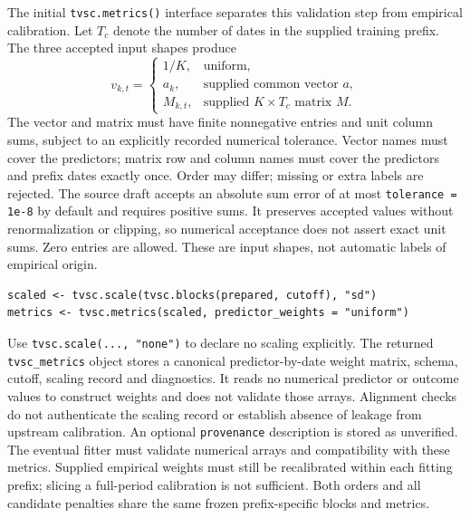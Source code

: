 \documentclass[11pt]{article}
\begin{document}
The initial \texttt{tvsc.metrics()} interface separates this validation
step from empirical calibration. Let $T_c$ denote the number of dates in
the supplied training prefix. The three accepted input shapes produce
\[
 v_{k,t}=\begin{cases}
  1/K, & \text{uniform},\\
  a_k, & \text{supplied common vector }a,\\
  M_{k,t}, & \text{supplied }K\times T_c\text{ matrix }M.
 \end{cases}
\]
The vector and matrix must have finite nonnegative entries and unit column
sums, subject to an explicitly recorded numerical tolerance. Vector names
must cover the predictors; matrix row and column names must cover the
predictors and prefix dates exactly once. Order may differ; missing or
extra labels are rejected. The source draft accepts an absolute sum error
of at most \texttt{tolerance = 1e-8} by default and requires positive sums.
It preserves accepted values without renormalization or clipping, so
numerical acceptance does not assert exact unit sums. Zero entries are
allowed. These are input shapes, not automatic labels of empirical origin.
\begin{verbatim}
scaled <- tvsc.scale(tvsc.blocks(prepared, cutoff), "sd")
metrics <- tvsc.metrics(scaled, predictor_weights = "uniform")
\end{verbatim}
Use \texttt{tvsc.scale(..., "none")} to declare no scaling explicitly.
The returned \texttt{tvsc\_metrics} object stores a canonical
predictor-by-date weight matrix, schema, cutoff, scaling record and
diagnostics. It reads no numerical predictor or outcome values to construct
weights and does not validate those arrays. Alignment checks do not
authenticate the scaling record or establish absence of leakage from
upstream calibration. An optional \texttt{provenance} description is stored
as unverified. The eventual fitter must validate numerical arrays and
compatibility with these metrics. Supplied empirical weights must still
be recalibrated within each fitting prefix; slicing a full-period
calibration is not sufficient. Both orders and all candidate penalties
share the same frozen prefix-specific blocks and metrics.
\end{document}
